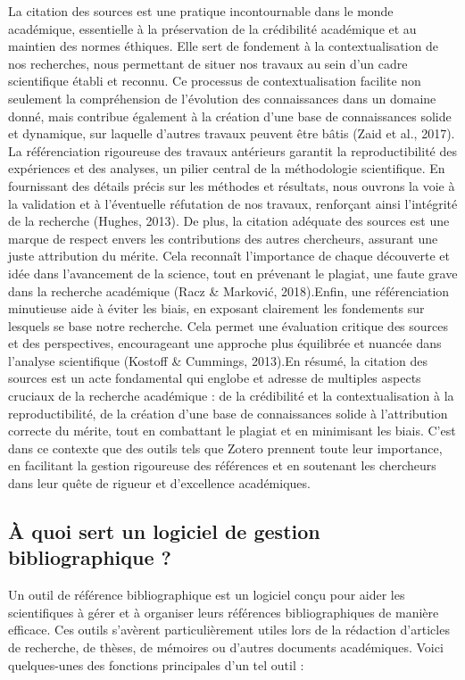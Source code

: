 \documentclass[
  letterpaper,
  DIV=11,
  numbers=noendperiod]{scrreprt}
\begin{document}
La citation des sources est une pratique incontournable dans le monde
académique, essentielle à la préservation de la crédibilité académique
et au maintien des normes éthiques. Elle sert de fondement à la
contextualisation de nos recherches, nous permettant de situer nos
travaux au sein d'un cadre scientifique établi et reconnu. Ce processus
de contextualisation facilite non seulement la compréhension de
l'évolution des connaissances dans un domaine donné, mais contribue
également à la création d'une base de connaissances solide et dynamique,
sur laquelle d'autres travaux peuvent être bâtis (Zaid et al., 2017). La
référenciation rigoureuse des travaux antérieurs garantit la
reproductibilité des expériences et des analyses, un pilier central de
la méthodologie scientifique. En fournissant des détails précis sur les
méthodes et résultats, nous ouvrons la voie à la validation et à
l'éventuelle réfutation de nos travaux, renforçant ainsi l'intégrité de
la recherche (Hughes, 2013). De plus, la citation adéquate des sources
est une marque de respect envers les contributions des autres
chercheurs, assurant une juste attribution du mérite. Cela reconnaît
l'importance de chaque découverte et idée dans l'avancement de la
science, tout en prévenant le plagiat, une faute grave dans la recherche
académique (Racz \& Marković, 2018).Enfin, une référenciation minutieuse
aide à éviter les biais, en exposant clairement les fondements sur
lesquels se base notre recherche. Cela permet une évaluation critique
des sources et des perspectives, encourageant une approche plus
équilibrée et nuancée dans l'analyse scientifique (Kostoff \& Cummings,
2013).En résumé, la citation des sources est un acte fondamental qui
englobe et adresse de multiples aspects cruciaux de la recherche
académique : de la crédibilité et la contextualisation à la
reproductibilité, de la création d'une base de connaissances solide à
l'attribution correcte du mérite, tout en combattant le plagiat et en
minimisant les biais. C'est dans ce contexte que des outils tels que
Zotero prennent toute leur importance, en facilitant la gestion
rigoureuse des références et en soutenant les chercheurs dans leur quête
de rigueur et d'excellence académiques.

\subsection{À quoi sert un logiciel de gestion bibliographique
?}\label{uxe0-quoi-sert-un-logiciel-de-gestion-bibliographique}

Un outil de référence bibliographique est un logiciel conçu pour aider
les scientifiques à gérer et à organiser leurs références
bibliographiques de manière efficace. Ces outils s'avèrent
particulièrement utiles lors de la rédaction d'articles de recherche, de
thèses, de mémoires ou d'autres documents académiques. Voici
quelques-unes des fonctions principales d'un tel outil :
\end{document}
